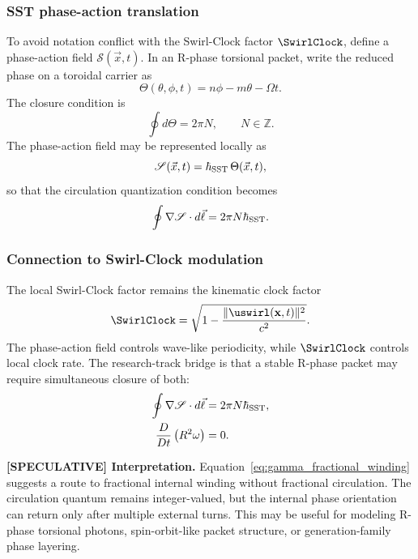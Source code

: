 \subsubsection{SST phase-action translation}
To avoid notation conflict with the Swirl-Clock factor $\SwirlClock$, define a phase-action field $\mathscr S(\vec x,t)$. In an R-phase torsional packet, write the reduced phase on a toroidal carrier as
\begin{equation}
    \Theta(\theta,\phi,t)
    = n\phi-m\theta-\Omega t.
    \label{eq:sst_torus_phase}
\end{equation}
The closure condition is
\begin{equation}
    \oint d\Theta = 2\pi N,
    \qquad N\in\mathbb Z.
    \label{eq:phase_closure_condition}
\end{equation}
The phase-action field may be represented locally as
\begin{equation}
    \mathscr S(\vec x,t)=\hbar_{\rm SST}\,\Theta(\vec x,t),
    \label{eq:phase_action_relation}
\end{equation}
so that the circulation quantization condition becomes
\begin{equation}
    \oint \nabla\mathscr S\cdot d\vec\ell
    =2\pi N\hbar_{\rm SST}.
    \label{eq:phase_action_quantization}
\end{equation}

\subsubsection{Connection to Swirl-Clock modulation}
The local Swirl-Clock factor remains the kinematic clock factor
\begin{equation}
    \SwirlClock
    =\sqrt{1-\frac{\lVert\uswirl(\mathbf{x},t)\rVert^2}{c^2}}.
    \label{eq:swirl_clock_factor_appendix}
\end{equation}
The phase-action field controls wave-like periodicity, while $\SwirlClock$ controls local clock rate. The research-track bridge is that a stable R-phase packet may require simultaneous closure of both:
\begin{align}
    \oint \nabla\mathscr S\cdot d\vec\ell &=2\pi N\hbar_{\rm SST},\label{eq:phase_closure}\\
    \frac{D}{Dt}\left(R^2\omega\right)&=0.\label{eq:kelvin_closure}
\end{align}

\textbf{[SPECULATIVE] Interpretation.}
Equation~\eqref{eq:gamma_fractional_winding} suggests a route to fractional internal winding without fractional circulation. The circulation quantum remains integer-valued, but the internal phase orientation can return only after multiple external turns. This may be useful for modeling R-phase torsional photons, spin-orbit-like packet structure, or generation-family phase layering.

